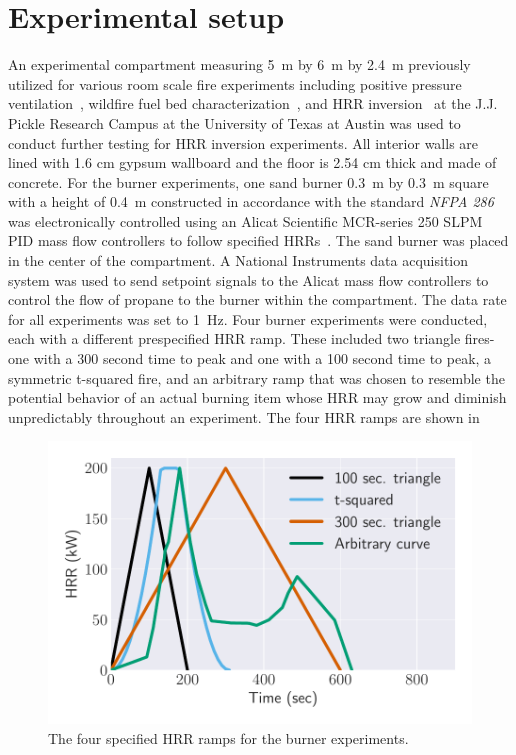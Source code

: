 \documentclass{article}
\begin{document}
\section{Experimental setup}
An experimental compartment measuring 5~m by 6~m by 2.4~m previously utilized for various room scale fire experiments including positive pressure ventilation~\cite{Weinschenk:2011}, wildfire fuel bed characterization~\cite{Overholt:2014}, and HRR inversion~\cite{Kurzawski:2017} at the J.J. Pickle Research Campus at the University of Texas at Austin was used to conduct further testing for HRR inversion experiments. All interior walls are lined with 1.6 cm gypsum wallboard and the floor is 2.54 cm thick and made of concrete. 
For the burner experiments, one sand burner 0.3~m by 0.3~m square with a height of 0.4~m constructed in accordance with the standard \textit{NFPA 286} was electronically controlled using an Alicat Scientific MCR-series 250 SLPM PID mass flow controllers to follow specified HRRs~\cite{NFPA:286}. The sand burner was placed in the center of the compartment. A National Instruments data acquisition system was used to send setpoint signals to the Alicat mass flow controllers to control the flow of propane to the burner within the compartment. The data rate for all experiments was set to 1~Hz. Four burner experiments were conducted, each with a different prespecified HRR ramp. These included two triangle fires- one with a 300 second time to peak and one with a 100 second time to peak, a symmetric t-squared fire, and an arbitrary ramp that was chosen to resemble the potential behavior of an actual burning item whose HRR may grow and diminish unpredictably throughout an experiment. The four HRR ramps are shown in  

\begin{figure}[htb] \centering
\includegraphics[width=.75\textwidth]{figures/training_ramps.pdf}
\caption{The four specified HRR ramps for the burner experiments.}
\label{fig:burner_ramps}
    \end{figure}
\end{document}
